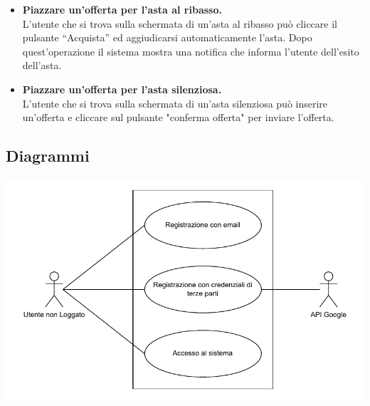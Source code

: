 \begin{itemize}
	\item \textbf{Piazzare un'offerta per l'asta al ribasso.}\\
	      L'utente che si trova sulla schermata di un'asta al ribasso può cliccare il pulsante “Acquista” ed aggiudicarsi automaticamente l'asta. Dopo quest'operazione il sistema mostra una notifica che informa l'utente dell'esito dell'asta.

	\item \textbf{Piazzare un'offerta per l'asta silenziosa.}\\
	      L'utente che si trova sulla schermata di un'asta silenziosa può inserire un'offerta e cliccare sul pulsante "conferma offerta" per inviare l'offerta.
\end{itemize}

\newpage
\subsection{Diagrammi}
\includegraphics[width=.7\textwidth]{images/utente_non_loggato_use_case_diagram.pdf}

